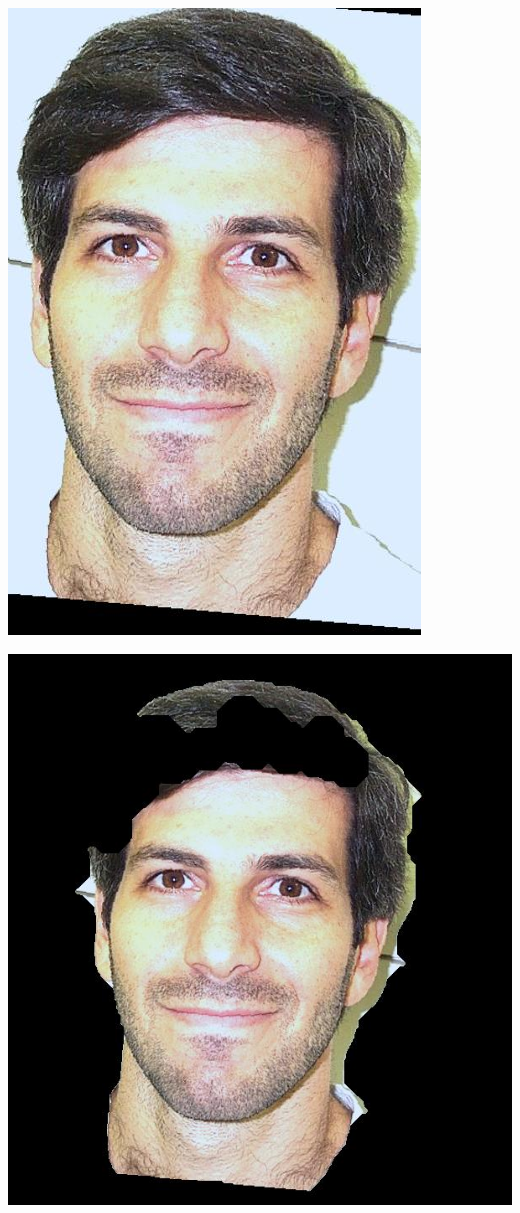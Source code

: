 \begin{Figure}
  \centering
    \includegraphics[width=0.5\columnwidth]{images/im9_cropped.jpg}
\end{Figure}

\begin{Figure}
  \centering
    \includegraphics[width=0.5\columnwidth]{images/im9_mask.jpg}
\end{Figure}

